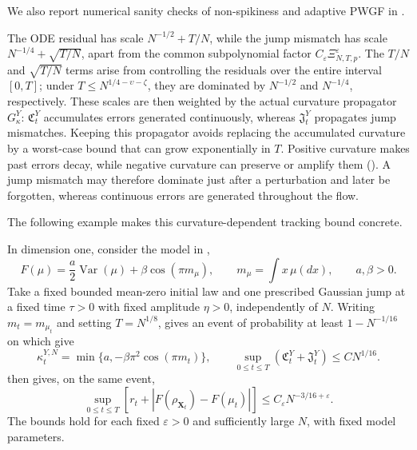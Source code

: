We also report numerical sanity checks of non-spikiness and adaptive PWGF in .

The ODE residual has scale \(N^{-1/2}+T/N\), while the jump mismatch has scale
\(N^{-1/4}+\sqrt{T/N}\), apart from the common subpolynomial factor
\(C_\varepsilon\Xi_{N,T,p}^{\varepsilon}\). The \(T/N\) and
\(\sqrt{T/N}\) terms arise from controlling the residuals over the entire
interval \([0,T]\); under
\(T\le N^{1/4-\upsilon-\zeta}\), they are dominated by \(N^{-1/2}\) and \(N^{-1/4}\),
respectively. These scales are then weighted by the actual curvature
propagator \(G_\kappa^Y\): \(\mathfrak C_t^Y\) accumulates errors generated
continuously, whereas \(\mathfrak J_t^Y\) propagates jump mismatches. Keeping this
propagator avoids replacing the accumulated curvature by a worst-case bound
that can grow exponentially in \(T\). Positive curvature makes past errors
decay, while negative curvature can preserve or amplify them
(). A jump mismatch may therefore dominate just
after a perturbation and later be forgotten, whereas continuous errors are
generated throughout the flow.

The following example makes this curvature-dependent tracking bound concrete.

\begin{example}
\label{ex:variance-cosine-curvature-recovery}
In dimension one, consider the model in ,
\[
 F(\mu)=\frac a2\operatorname{Var}(\mu)+\beta\cos(\pi m_\mu),
 \qquad m_\mu=\int x\,\mu(dx),\qquad a,\beta>0.
\]
Take a fixed bounded mean-zero initial law and one prescribed Gaussian jump
at a fixed time $\tau>0$ with fixed amplitude $\eta>0$, independently of $N$.
Writing $m_t=m_{\mu_t}$ and setting $T=N^{1/8}$,
 gives an event of probability at least
$1-N^{-1/16}$ on which
 give
\[
 \kappa_t^{Y,N}=\min\{a,-\beta\pi^2\cos(\pi m_t)\},
 \qquad
 \sup_{0\le t\le T}(\mathfrak C_t^Y+\mathfrak J_t^Y)\le CN^{1/16}.
\]
 then gives, on the same event,
\[
 \sup_{0\le t\le T}
 \left[r_t+\left|F(\rho_{\mathbf X_t})-F(\mu_t)\right|\right]
 \le C_\varepsilon N^{-3/16+\varepsilon}.
\]
The bounds hold for each fixed $\varepsilon>0$ and sufficiently large $N$,
with fixed model parameters.
\end{example}

